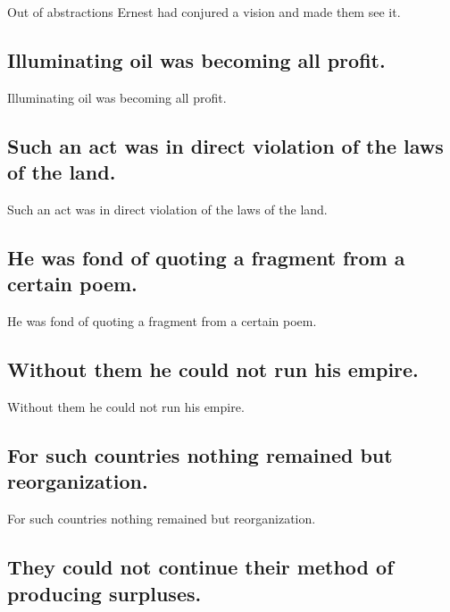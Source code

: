 \documentclass[]{article}
\begin{document}
Out of abstractions Ernest had conjured a vision and made them see it.

\hypertarget{illuminating-oil-was-becoming-all-profit.}{%
\subsection{Illuminating oil was becoming all
profit.}\label{illuminating-oil-was-becoming-all-profit.}}

Illuminating oil was becoming all profit.

\hypertarget{such-an-act-was-in-direct-violation-of-the-laws-of-the-land.}{%
\subsection{Such an act was in direct violation of the laws of the
land.}\label{such-an-act-was-in-direct-violation-of-the-laws-of-the-land.}}

Such an act was in direct violation of the laws of the land.

\hypertarget{he-was-fond-of-quoting-a-fragment-from-a-certain-poem.}{%
\subsection{He was fond of quoting a fragment from a certain
poem.}\label{he-was-fond-of-quoting-a-fragment-from-a-certain-poem.}}

He was fond of quoting a fragment from a certain poem.

\hypertarget{without-them-he-could-not-run-his-empire.}{%
\subsection{Without them he could not run his
empire.}\label{without-them-he-could-not-run-his-empire.}}

Without them he could not run his empire.

\hypertarget{for-such-countries-nothing-remained-but-reorganization.}{%
\subsection{For such countries nothing remained but
reorganization.}\label{for-such-countries-nothing-remained-but-reorganization.}}

For such countries nothing remained but reorganization.

\hypertarget{they-could-not-continue-their-method-of-producing-surpluses.}{%
\subsection{They could not continue their method of producing
surpluses.}\label{they-could-not-continue-their-method-of-producing-surpluses.}}
\end{document}
